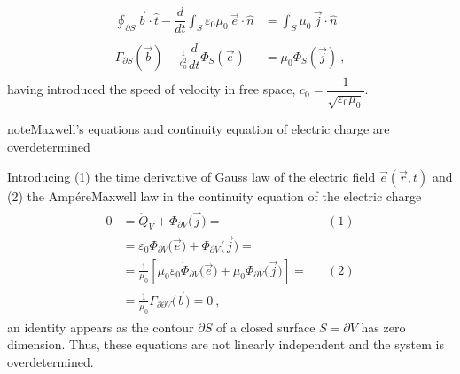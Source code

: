 \documentclass[letterpaper,10pt,english]{jupyterBook}
\begin{document}
\begin{equation*}
\begin{split}\begin{aligned}
    \oint_{\partial S} \vec{b} \cdot \hat{t} - \dfrac{d}{dt} \int_{S} \varepsilon_0 \mu_0 \, \vec{e} \cdot \hat{n} & = \int_{S} \mu_0 \, \vec{j} \cdot \hat{n} \\ \\
    \Gamma_{\partial S} \left( \vec{b} \right) - \frac{1}{c_0^2} \dfrac{d}{dt} \Phi_{S} \left( \vec{e} \right) & = \mu_0 \Phi_{S} \left( \vec{j} \right) \ ,
\end{aligned}\end{split}
\end{equation*}
\sphinxAtStartPar
having introduced the speed of velocity in free space, \(c_0 = \dfrac{1}{\sqrt{\varepsilon_0 \mu_0}}\).

\begin{sphinxadmonition}{note}{Maxwell’s equations and continuity equation of electric charge are overdetermined}

\sphinxAtStartPar
Introducing (1) the time derivative of Gauss law of the electric field \(\vec{e}(\vec{r},t)\) and (2) the Ampére\sphinxhyphen{}Maxwell law in the continuity equation of the electric charge
\begin{equation*}
\begin{split}\begin{aligned}
  0 & = \dot{Q}_V + \Phi_{\partial V}\big( \vec{j} \big) = && (1) \\
    & = \varepsilon_0 \dot{\Phi}_{\partial V}\big( \vec{e} \big) + \Phi_{\partial V}\big( \vec{j} \big) =\\
    & = \frac{1}{\mu_0} \left[ \mu_0 \varepsilon_0 \dot{\Phi}_{\partial V}\big( \vec{e} \big) + \mu_0 \Phi_{\partial V}\big( \vec{j} \big)\right] =  && (2) \\
    & = \frac{1}{\mu_0} \Gamma_{\partial \partial V} \big( \vec{b} \big) = 0 \ ,
\end{aligned}\end{split}
\end{equation*}
\sphinxAtStartPar
an identity appears as the contour \(\partial S\) of a closed surface \(S = \partial V\) has zero dimension. Thus, these equations are not linearly independent and the system is over\sphinxhyphen{}determined.
\end{sphinxadmonition}
\end{document}
